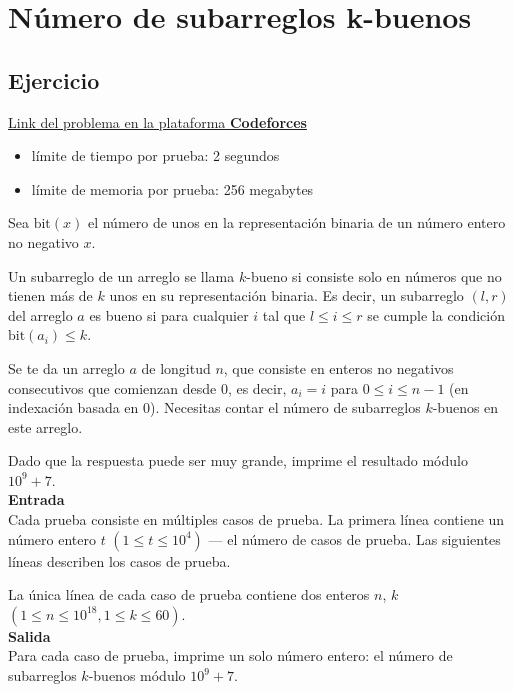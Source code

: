 \documentclass{article}
\begin{document}
\section{Número de subarreglos k-buenos}

\subsection{Ejercicio}

\href{https://codeforces.com/problemset/problem/1982/E}{Link del problema en la plataforma \textbf{Codeforces}}

\begin{itemize}
    \item límite de tiempo por prueba: 2 segundos
    \item límite de memoria por prueba: 256 megabytes
\end{itemize}

Sea $\text{bit}(x)$ el número de unos en la representación binaria de un número entero no negativo $x$.

Un subarreglo de un arreglo se llama $k$-bueno si consiste solo en números que no tienen más de $k$ unos en su representación binaria. Es decir, un subarreglo $(l, r)$ del arreglo $a$ es bueno si para cualquier $i$ tal que $l \leq i \leq r$ se cumple la condición $\text{bit}(a_i) \leq k$.

Se te da un arreglo $a$ de longitud $n$, que consiste en enteros no negativos consecutivos que comienzan desde 0, es decir, $a_i = i$ para $0 \leq i \leq n-1$ (en indexación basada en 0). Necesitas contar el número de subarreglos $k$-buenos en este arreglo.

Dado que la respuesta puede ser muy grande, imprime el resultado módulo $10^9 + 7$.\\

\textbf{Entrada}\\

Cada prueba consiste en múltiples casos de prueba. La primera línea contiene un número entero $t$ $(1 \leq t \leq 10^4)$ — el número de casos de prueba. Las siguientes líneas describen los casos de prueba.

La única línea de cada caso de prueba contiene dos enteros $n$, $k$ $(1 \leq n \leq 10^{18}, 1 \leq k \leq 60)$.\\

\textbf{Salida}\\

Para cada caso de prueba, imprime un solo número entero: el número de subarreglos $k$-buenos módulo $10^9 + 7$.
\end{document}
